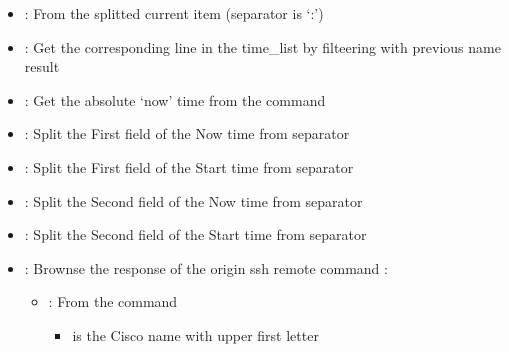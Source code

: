 \documentclass[letterpaper,10pt,english]{sphinxmanual}
\begin{document}
\begin{itemize}
\item {} 
\sphinxAtStartPar
{} : From the splitted current item (separator is ‘:’)

\item {} 
\sphinxAtStartPar
{} : Get the corresponding line in the time\_list by filteering with previous name result

\item {} 
\sphinxAtStartPar
{} : Get the absolute ‘now’ time from the command 

\item {} 
\sphinxAtStartPar
{} : Split the First field of the Now time from separator 

\item {} 
\sphinxAtStartPar
{} : Split the First field of the Start time from separator 

\item {} 
\sphinxAtStartPar
{} : Split the Second field of the Now time from separator 

\item {} 
\sphinxAtStartPar
{} : Split the Second field of the Start time from separator 

\item {} 
\sphinxAtStartPar
{} : Brownse the response of the origin ssh remote command : 
\begin{itemize}
\item {} 
\sphinxAtStartPar
{} : From the command 
\begin{itemize}
\item {} 
\sphinxAtStartPar
{} is the Cisco name with upper first letter


\end{itemize}
\end{itemize}
\end{itemize}
\end{document}
